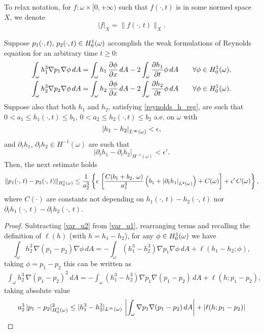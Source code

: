 To relax notation, for $f:\omega\times [0,+\infty)$ such that $f(\cdot,t)$ is in some normed space $X$, we denote
$$\left|f\right|_X=\|f(\cdot,\,t)\|_X.$$
\begin{theorem}
Suppose $p_1(\cdot,t),\,p_2(\cdot,t)\in{H_0^1(\omega)}$ accomplish the weak formulations of Reynolds equation for an arbitrary time $t\geq 0$:
\begin{align}
\int_\omega h_1^3\nabla p_1 \nabla \phi\,dA&=\int_\omega h_1\,\parder{\phi}{x}\,dA-2 \int_\omega \frac{\partial h_1 }{\partial t}\phi\,dA\qquad \forall \phi\in \hzerooneom,\label{eq:var_u1}\\
\int_\omega h_2^3\nabla p_2 \nabla \phi\,dA&=\int_\omega h_2\,\parder{\phi}{x}\,dA-2 \int_\omega \frac{\partial h_2 }{\partial t}\phi\,dA\qquad \forall \phi\in \hzerooneom.\label{eq:var_u2}
\end{align}
Suppose also that both $h_1$ and $h_2$, satisfying \eqref*{reynolds_h_reg}, are such that $0<a_1\leq h_1(\cdot,t) \leq b_1$, $0<a_2\leq h_2(\cdot,t) \leq b_2$ a.e. on $\omega$ with 
$$\left|h_1-h_2\right|_{L^{\infty}(\omega)}<\epsilon,$$
and $\partial_t h_1$, $\partial_t h_2\in {H^{-1}(\omega)}$ are such that $$\left|\partial_t h_1-\partial_t h_2\right|_{H^{-1}(\omega)}<\epsilon'.$$ Then, the next estimate holds
\begin{align}
\|p_1(\cdot,\,t)-p_2(\cdot,\,t)\|_\hzerooneom \leq\frac{1}{a_2^3} \left\{\epsilon\, \left[\frac{C(b_1+b_2,\,\omega)}{a_1^3}\left(b_1+\left|\partial_t h_1\right|_\lpom{2}\right)+C(\omega)\right]+\epsilon'\,C(\omega)\right\},\label{eq:bound4}
\end{align}
where $C(\cdot)$ are constants not depending on $h_1(\cdot,\,t)-h_2(\cdot,\,t)$ nor $\partial_t h_1(\cdot,\,t)-\partial_t h_2(\cdot,\,t)$.
\begin{proof}
Subtracting \eqref{var_u2} from \eqref{var_u1}, rearranging terms and recalling the definition of $\ell(h)$ (with $h=h_1-h_2$), for any $\phi\in {H_0^1(\omega)}$ we have
$$\int_\omega h_2^3\,\nabla (p_1-p_2)\nabla \phi\,dA=-\int_\omega (h_1^3-h_2^3)\nabla p_1\nabla \phi\,dA+\ell(h_1-h_2;\phi),$$
taking $\phi=p_1-p_2$ this can be written as 
\begin{align*}
\int_\omega h_2^3\,\nabla (p_1-p_2)^2\,dA=-\int_\omega (h_1^3-h_2^3)\nabla p_1\nabla(p_1-p_2)\,dA+\ell(h;p_1-p_2),
\end{align*}
taking absolute value
\begin{align}
a_2^3\,|p_1-p_2|_\hzerooneom ^2&\leq |h_1^3-h_2^3|_\lpom{\infty}\,\left|\int_\omega \nabla p_1\nabla(p_1-p_2)\, dA\right| + |\ell(h;p_1-p_2)|\nonumber\\

\end{align}
\end{proof}
\end{theorem}
